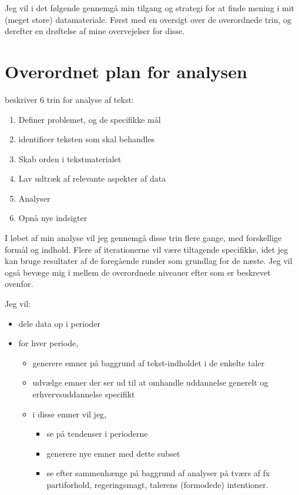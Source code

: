 Jeg vil i det følgende gennemgå min tilgang og strategi for at finde mening i mit (meget store) datamateriale.
Først med en oversigt over de overordnede trin, og derefter en drøftelse af mine overvejelser for disse. 

\section{Overordnet plan for analysen}\label{sec:plan}

\autocite{kwartlerTextMiningPractice2017} beskriver 6 trin for analyse af tekst:
\begin{enumerate}
  \item
    Definer problemet, og de specifikke mål
  \item
    identificer teksten som skal behandles
  \item
    Skab orden i tekstmaterialet
  \item
    Lav udtræk af relevante aspekter af data
  \item
    Analyser
  \item
    Opnå nye indsigter
\end{enumerate}

I løbet af min analyse vil jeg gennemgå disse trin flere gange, med forskellige formål og indhold.
Flere af iterationerne vil være tiltagende specifikke, idet jeg kan bruge resultater af de foregående runder som grundlag for de næste.
Jeg vil også bevæge mig i mellem de overordnede niveauer efter \autocite{evansMachineTranslationMining2016} som er beskrevet ovenfor.

Jeg vil:

\begin{itemize}
  \item
    dele data op i perioder
  \item
    for hver periode,
    \begin{itemize}
      \item
        generere emner på baggrund af tekst-indholdet i de enkelte taler
      \item
        udvælge emner der ser ud til at omhandle uddannelse generelt og erhvervsuddannelse specifikt
      \item
        i disse emner vil jeg, 
        \begin{itemize}
          \item
            se på tendenser i perioderne
          \item
            generere nye emner med dette subset
          \item
            se efter sammenhænge på baggrund af analyser på tværs af fx partiforhold, regeringsmagt, talerens (formodede) intentioner.
        \end{itemize}
    \end{itemize}
\end{itemize}

